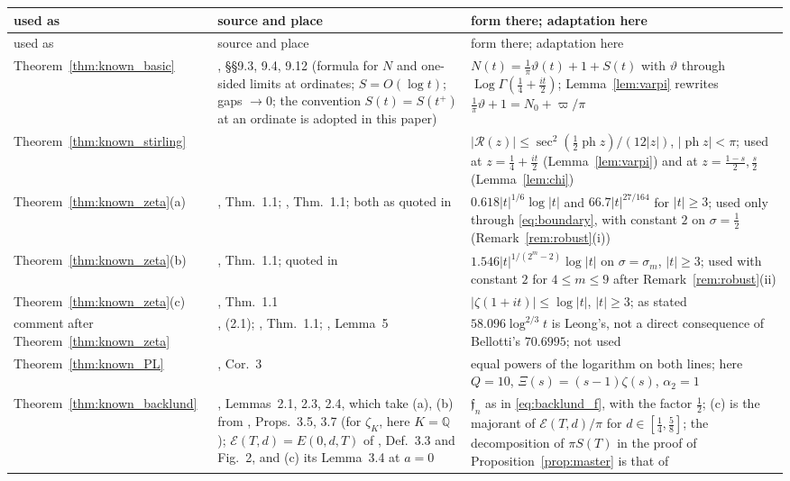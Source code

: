 \documentclass[11pt,a4paper]{article}
\makeatletter
\numberwithin{equation}{section}
\DeclareRobustCommand{\CGref}[1]{\ref{#1}}
\DeclareRobustCommand{\CGeqref}[1]{\eqref{#1}}
\DeclareRobustCommand{\CGcite}[2][]{\if\relax\detokenize{#1}\relax\cite{#2}\else\cite[#1]{#2}\fi}
\let\CG@origref\ref
\let\CG@origeqref\eqref
\newcommand{\CG@gettip}[1]{\@ifundefined{CGTip@#1}{#1}{\csname CGTip@#1\endcsname}}
\newcommand{\CG@getbib}[1]{\@ifundefined{CGBib@#1}{#1}{\csname CGBib@#1\endcsname}}
\DeclareRobustCommand{\CGref}[1]{\pdftooltip{\CG@origref{#1}}{\CG@gettip{#1}}}
\DeclareRobustCommand{\CGeqref}[1]{\pdftooltip{\CG@origeqref{#1}}{\CG@gettip{#1}}}
\DeclareRobustCommand{\CGcite}[2][]{\pdftooltip{\if\relax\detokenize{#1}\relax\cite{#2}\else\cite[#1]{#2}\fi}{\CG@getbib{#2}}}
\theoremstyle{definition}
\theoremstyle{remark}
\newcommand{\Nz}{N_0} %
\makeatother
\begin{document}
\begin{center}\small
\begin{longtable}{p{}p{}p{}}
\toprule used as & source and place & form there; adaptation here\\\midrule\endfirsthead
\toprule used as & source and place & form there; adaptation here\\\midrule\endhead
\bottomrule\endfoot
Theorem~\CGref{thm:known_basic} & \CGcite{Titchmarsh1986}, \S\S9.3, 9.4, 9.12 (formula for $N$ and one-sided limits at ordinates; $S=O(\log t)$; gaps $\to0$; the convention $S(t)=S(t^+)$ at an ordinate is adopted in this paper) & $N(t)=\frac1\pi\vartheta(t)+1+S(t)$ with $\vartheta$ through $\operatorname{Log}\Gamma(\frac14+\frac{it}2)$; Lemma~\CGref{lem:varpi} rewrites $\frac1\pi\vartheta+1=\Nz+\varpi/\pi$\\
Theorem~\CGref{thm:known_stirling} & \CGcite[\S5.11(ii)]{DLMF} & $|\mathcal R(z)|\le\sec^2(\frac12\operatorname{ph}z)/(12|z|)$, $|\operatorname{ph}z|<\pi$; used at $z=\frac14+\frac{it}2$ (Lemma~\CGref{lem:varpi}) and at $z=\frac{1-s}2,\frac s2$ (Lemma~\CGref{lem:chi})\\
Theorem~\CGref{thm:known_zeta}(a) & \CGcite{HiaryPatelYang2024}, Thm.~1.1; \CGcite{PatelYang2023}, Thm.~1.1; both as quoted in \CGcite[\S2, display before (2.3)]{BellottiWong2025} & $0.618|t|^{1/6}\log|t|$ and $66.7|t|^{27/164}$ for $|t|\ge3$; used only through \CGeqref{eq:boundary}, with constant $2$ on $\sigma=\frac12$ (Remark~\CGref{rem:robust}(i))\\
Theorem~\CGref{thm:known_zeta}(b) & \CGcite{Yang2024}, Thm.~1.1; quoted in \CGcite[(2.4)]{BellottiWong2025} & $1.546|t|^{1/(2^m-2)}\log|t|$ on $\sigma=\sigma_m$, $|t|\ge3$; used with constant $2$ for $4\le m\le9$ after Remark~\CGref{rem:robust}(ii)\\
Theorem~\CGref{thm:known_zeta}(c) & \CGcite{Patel2022}, Thm.~1.1 & $|\zeta(1+it)|\le\log|t|$, $|t|\ge3$; as stated\\
comment after Theorem~\CGref{thm:known_zeta} & \CGcite{BellottiWong2025}, (2.1); \CGcite{Bellotti2024}, Thm.~1.1; \CGcite{Leong2024}, Lemma~5 & $58.096\log^{2/3}t$ is Leong's, not a direct consequence of Bellotti's $70.6995$; not used\\
Theorem~\CGref{thm:known_PL} & \CGcite{Fiori2025}, Cor.~3 & equal powers of the logarithm on both lines; here $Q=10$, $\Xi(s)=(s-1)\zeta(s)$, $\alpha_2=1$\\
Theorem~\CGref{thm:known_backlund} & \CGcite{BellottiWong2025}, Lemmas~2.1, 2.3, 2.4, which take (a), (b) from \CGcite{HasanalizadeShenWong2021}, Props.~3.5, 3.7 (for $\zeta_K$, here $K=\mathbb Q$); $\mathcal E(T,d)=E(0,d,T)$ of \CGcite{BennettEtAl2021}, Def.~3.3 and Fig.~2, and (c) its Lemma~3.4 at $a=0$ & $\mathfrak f_n$ as in \CGeqref{eq:backlund_f}, with the factor $\frac12$; (c) is the majorant of $\mathcal E(T,d)/\pi$ for $d\in[\frac14,\frac58]$; the decomposition of $\pi S(T)$ in the proof of Proposition~\CGref{prop:master} is that of \CGcite[\S3]{BellottiWong2025}\\

\end{longtable}
\end{center}
\end{document}
